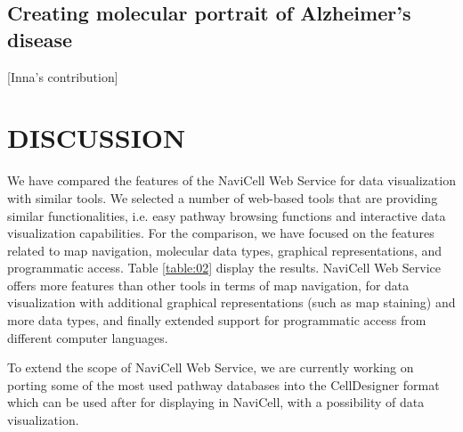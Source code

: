 \documentclass[a4,center,fleqn]{NAR}
\begin{document}
\subsection{Creating molecular portrait of Alzheimer's disease}

[Inna's contribution]

\section{DISCUSSION}

We have compared the features of the NaviCell Web Service for data visualization
with similar tools. We selected a number of web-based tools that are providing
similar functionalities, i.e. easy pathway browsing functions and interactive data
visualization capabilities. For the comparison, we have focused on the features
related to map navigation, molecular data types, graphical representations,
and programmatic access. Table \ref{table:02} display the results. NaviCell Web
Service offers more features than other tools in terms of map navigation, for
data visualization with additional graphical representations (such as map
staining) and more data types, and finally extended support for programmatic
access from different computer languages.

To extend the scope of NaviCell Web Service, we are currently working on porting some of the
most used pathway databases into the CellDesigner format which can be used after for displaying
in NaviCell, with a possibility of data visualization.
\end{document}
